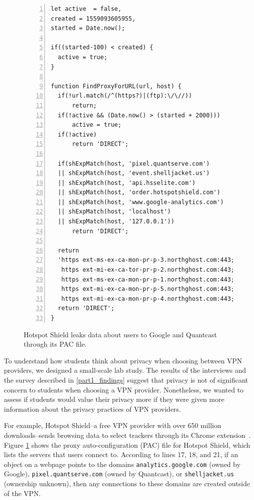 
\begin{figure}[t]
    \begin{lstlisting}[basicstyle=\fontsize{6.5}{11}\selectfont, xleftmargin=2.5em,frame=single,framexleftmargin=3em, numbers=left]
let active  = false,
created = 1559093605955,
started = Date.now();

if((started-100) < created) {
  active = true;
}

function FindProxyForURL(url, host) {
  if(!url.match(/^(https?)|(ftp):\/\//)) 
      return;
  if(!active && (Date.now() > (started + 2000))) 
      active = true;
  if(!active) 
      return 'DIRECT';

  if(shExpMatch(host, 'pixel.quantserve.com') 
  || shExpMatch(host, 'event.shelljacket.us') 
  || shExpMatch(host, 'api.hsselite.com') 
  || shExpMatch(host, 'order.hotspotshield.com') 
  || shExpMatch(host, 'www.google-analytics.com') 
  || shExpMatch(host, 'localhost') 
  || shExpMatch(host, '127.0.0.1')) 
      return 'DIRECT';

  return 
  'https ext-ms-ex-ca-mon-pr-p-3.northghost.com:443;
   https ext-mi-ex-ca-tor-pr-p-2.northghost.com:443;
   https ext-ms-ex-ca-mon-pr-p-1.northghost.com:443;
   https ext-mi-ex-ca-mon-pr-p-5.northghost.com:443;
   https ext-mi-ex-ca-mon-pr-p-4.northghost.com:443;';
  return 'DIRECT';
}
    \end{lstlisting}
\caption{Hotspot Shield leaks data about users to Google and Quantcast through its PAC file.}
\label{fig:hotspot_pac}
\end{figure}

To understand how students think about privacy when choosing between VPN
providers, we designed a small-scale lab study.  The results of the interviews
and the survey described in \ref{part1_findings} suggest that privacy is not of
significant concern to students when choosing a VPN provider.
Nonetheless, we wanted to assess if students would value their privacy more if
they were given more information about the privacy practices of VPN providers.

For example, Hotspot Shield--a free VPN provider with over 650 million downloads--sends browsing data to select trackers through its Chrome extension~\cite{hotspot_shield, windscribe_hotspot}. Figure \ref{fig:hotspot_pac} shows the proxy auto-configuration (PAC) file for Hotspot Shield, which lists the servers that users connect to. According to lines 17, 18, and 21, if an object on a webpage points to the domains \texttt{analytics.google.com} (owned by Google), \texttt{pixel.quantserve.com} (owned by Quantcast), or \texttt{shelljacket.us} (ownership unknown), then any connections to these domains are created outside of the VPN. 

